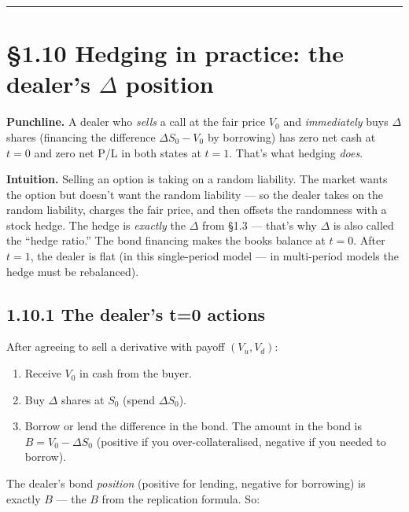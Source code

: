 \documentclass[
  10pt,
  twoside]{book}
\providecommand{\tightlist}{%
  \setlength{\itemsep}{0pt}\setlength{\parskip}{0pt}}
\begin{document}
\begin{center}\rule{0.5\linewidth}{0.5pt}\end{center}

\section{\texorpdfstring{§1.10 Hedging in practice: the dealer's
\(\Delta\)
position}{§1.10 Hedging in practice: the dealer's \textbackslash Delta position}}\label{hedging-in-practice-the-dealers-delta-position}

\textbf{Punchline.} A dealer who \emph{sells} a call at the fair price
\(V_0\) and \emph{immediately} buys \(\Delta\) shares (financing the
difference \(\Delta S_0 - V_0\) by borrowing) has zero net cash at
\(t=0\) and zero net P/L in both states at \(t=1\). That's what hedging
\emph{does}.

\textbf{Intuition.} Selling an option is taking on a random liability.
The market wants the option but doesn't want the random liability --- so
the dealer takes on the random liability, charges the fair price, and
then offsets the randomness with a stock hedge. The hedge is
\emph{exactly} the \(\Delta\) from §1.3 --- that's why \(\Delta\) is
also called the ``hedge ratio.'' The bond financing makes the books
balance at \(t=0\). After \(t=1\), the dealer is flat (in this
single-period model --- in multi-period models the hedge must be
rebalanced).

\subsection{1.10.1 The dealer's t=0
actions}\label{the-dealers-t0-actions}

After agreeing to sell a derivative with payoff \((V_u, V_d)\):

\begin{enumerate}
\def\labelenumi{\arabic{enumi}.}
\tightlist
\item
  Receive \(V_0\) in cash from the buyer.
\item
  Buy \(\Delta\) shares at \(S_0\) (spend \(\Delta S_0\)).
\item
  Borrow or lend the difference in the bond. The amount in the bond is
  \(B = V_0 - \Delta S_0\) (positive if you over-collateralised,
  negative if you needed to borrow).
\end{enumerate}

The dealer's bond \emph{position} (positive for lending, negative for
borrowing) is exactly \(B\) --- the \(B\) from the replication formula.
So:
\end{document}
